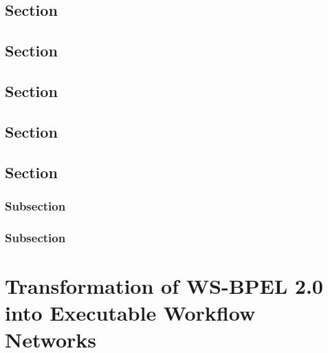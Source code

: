 \section{Section}

\section{Section}

\section{Section}

\section{Section}

\section{Section}

\subsection{Subsection}
\label{ssec:example}
\blindtext

\subsection{Subsection}

\chapter{Transformation of WS-BPEL 2.0 into Executable Workflow Networks}
\label{chap:bpel-ewfn-transformation}

\blindtext[3]


